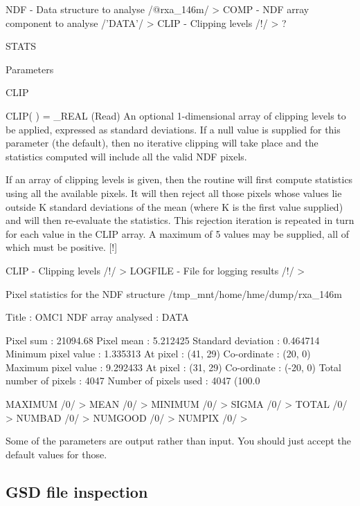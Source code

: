 \documentclass[11pt,noabs]{starlink}
\begin{document}
\begin{terminalv}
NDF - Data structure to analyse /@rxa_146m/ >
COMP - NDF array component to analyse /'DATA'/ >
CLIP - Clipping levels /!/ > ?

STATS

 Parameters

   CLIP

     CLIP( ) = _REAL (Read)
        An optional 1-dimensional array of clipping levels to be
        applied, expressed as standard deviations.  If a null value is
        supplied for this parameter (the default), then no iterative
        clipping will take place and the statistics computed will
        include all the valid NDF pixels.

        If an array of clipping levels is given, then the routine will
        first compute statistics using all the available pixels. It
        will then reject all those pixels whose values lie outside K
        standard deviations of the mean (where K is the first value
        supplied) and will then re-evaluate the statistics. This
        rejection iteration is repeated in turn for each value in the
        CLIP array.  A maximum of 5 values may be supplied, all of
        which must be positive. [!]

CLIP - Clipping levels /!/ >
LOGFILE - File for logging results /!/ >

  Pixel statistics for the NDF structure
  /tmp_mnt/home/hme/dump/rxa_146m

     Title                     : OMC1
     NDF array analysed        : DATA

        Pixel sum              : 21094.68
        Pixel mean             : 5.212425
        Standard deviation     : 0.464714
        Minimum pixel value    : 1.335313
           At pixel            : (41, 29)
           Co-ordinate         : (20, 0)
        Maximum pixel value    : 9.292433
           At pixel            : (31, 29)
           Co-ordinate         : (-20, 0)
        Total number of pixels : 4047
        Number of pixels used  : 4047 (100.0%

MAXIMUM /0/ >
MEAN /0/ >
MINIMUM /0/ >
SIGMA /0/ >
TOTAL /0/ >
NUMBAD /0/ >
NUMGOOD /0/ >
NUMPIX /0/ >
\end{terminalv}

   Some of the parameters are output rather than input. You should just accept
   the default values for those.

\subsection{\label{trace1}GSD file inspection}
\end{document}
